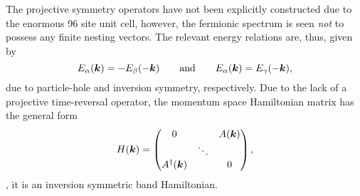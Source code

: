 The projective symmetry operators have not been explicitly constructed due to the enormous 96 site unit cell, however, the fermionic spectrum is seen \textit{not} to possess any finite nesting vectors.
The relevant energy relations are, thus, given by
%
\begin{equation}
	E_{\alpha}(\bm{k}) = -E_{\beta}(-\bm{k}) \qquad {\rm and} \qquad E_{\alpha}(\bm{k}) = E_{\gamma}(-\bm{k}),
\end{equation}
%
due to particle-hole and inversion symmetry, respectively.
Due to the lack of a projective time-reversal operator, the momentum space Hamiltonian matrix has the general form
%
\begin{equation}
	H(\bm{k}) = 
		\begin{pmatrix}
			0			&		 & A(\bm{k}) \\
			& \ddots & 		  \\
			A^{\dagger}(\bm{k})	&		 & 0
		\end{pmatrix},
\end{equation}
%
\ie, it is an inversion symmetric band Hamiltonian.
\newpage


%
%
